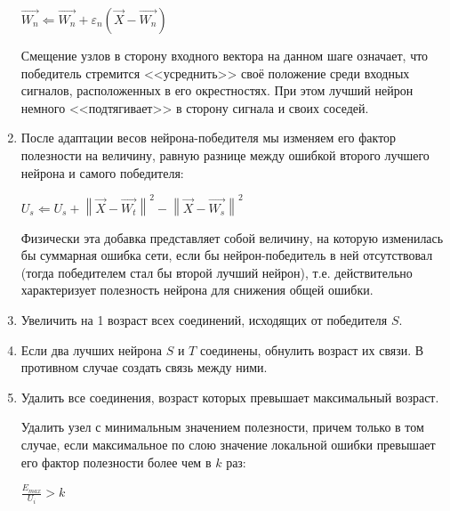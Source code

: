 \documentclass[unicode, 12pt, a4paper,oneside,fleqn]{article}
\begin{document}
\begin{enumerate}
  $\vec{W_n} \Leftarrow \vec{W_n}+\varepsilon_n(\vec{X}-\vec{W_n})$

  Смещение узлов в сторону входного вектора на данном шаге означает,
  что победитель стремится <<усреднить>> своё положение среди входных
  сигналов, расположенных в его окрестностях. При этом лучший нейрон
  немного <<подтягивает>> в сторону сигнала и своих соседей.

\item \label{gng-u:8} %
  После адаптации весов нейрона-победителя мы изменяем его фактор
  полезности на величину, равную разнице между ошибкой второго лучшего
  нейрона и самого победителя:

  $U_{s} \Leftarrow U_{s} + \left\|\vec{X}-\vec{W_t}\right\|^{2} -
                            \left\|\vec{X}-\vec{W_s}\right\|^{2}$

  Физически эта добавка представляет собой величину, на которую
  изменилась бы суммарная ошибка сети, если бы нейрон-победитель в ней
  отсутствовал (тогда победителем стал бы второй лучший нейрон),
  т.е. действительно характеризует полезность нейрона для снижения
  общей ошибки.

\item \label{gng-u:9} \label{gng:8}
  Увеличить на 1 возраст всех соединений, исходящих от победителя $S$.

\item \label{gng-u:10} \label{gng:9}
  Если два лучших нейрона $S$ и $T$ соединены, обнулить возраст их
  связи. В противном случае создать связь между ними.


\item \label{gng-u:11} %
  Удалить все соединения, возраст которых превышает максимальный
  возраст.

  Удалить узел с минимальным значением полезности, причем
  только в том случае, если максимальное по слою значение локальной
  ошибки превышает его фактор полезности более чем в $k$ раз:

  $\frac{E_{max}}{U_i} > k$

\end{enumerate}
\end{document}
